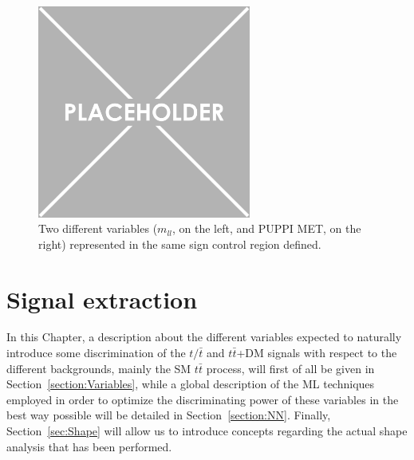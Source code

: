 \documentclass[a4paper, 10pt, openright]{report}
\begin{document}
\begin{figure}[htbp]
{\begin{minipage}[b]{.48\textwidth}
\end{minipage}\hfill
\begin{minipage}[b]{.48\textwidth}
\includegraphics[width=7cm, height=7cm]{figs/placeholder.png}
\end{minipage} \hfill
}
\caption{Two different variables ($m_{ll}$, on the left, and \ac{PUPPI} \ac{MET}, on the right) represented in the same sign control region defined.}
\label{fig:SSCR}
\end{figure}



























\chapter{Signal extraction} \label{section:Discrimination}

In this Chapter, a description about the different variables expected to naturally introduce some discrimination of the $t/\bar t$ and $t \bar t$+DM signals with respect to the different backgrounds, mainly the \ac{SM} $t \bar t$ process, will first of all be given in Section~\ref{section:Variables}, while a global description of the \ac{ML} techniques employed in order to optimize the discriminating power of these variables in the best way possible will be detailed in Section~\ref{section:NN}. Finally, Section~\ref{sec:Shape} will allow us to introduce concepts regarding the actual shape analysis that has been performed.
\end{document}
